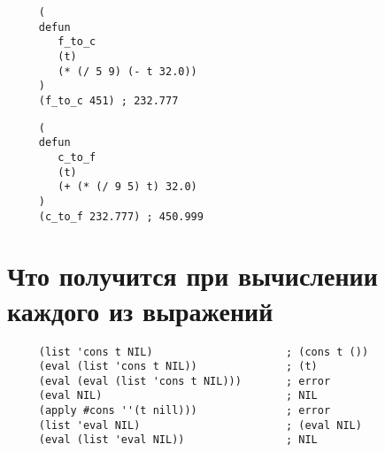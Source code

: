 \begin{lstlisting}
     (
     defun
        f_to_c
        (t)
        (* (/ 5 9) (- t 32.0))
     )
     (f_to_c 451) ; 232.777
\end{lstlisting}

\begin{lstlisting}
     (
     defun
        c_to_f
        (t)
        (+ (* (/ 9 5) t) 32.0)
     )
     (c_to_f 232.777) ; 450.999
\end{lstlisting}

\section{Что получится при вычислении каждого из выражений}

\begin{lstlisting}
     (list 'cons t NIL)                     ; (cons t ())
     (eval (list 'cons t NIL))              ; (t)
     (eval (eval (list 'cons t NIL)))       ; error
     (eval NIL)                             ; NIL
     (apply #cons ''(t nill)))              ; error
     (list 'eval NIL)                       ; (eval NIL)
     (eval (list 'eval NIL))                ; NIL
\end{lstlisting}
